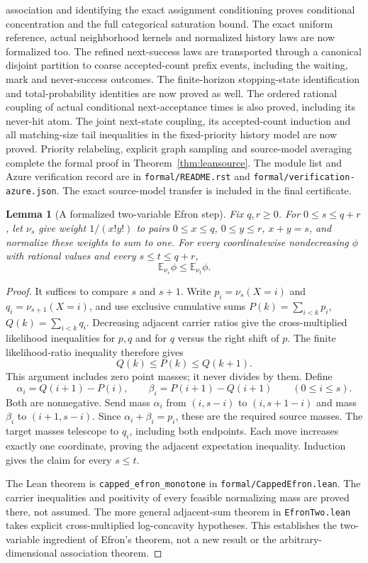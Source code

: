 \documentclass[11pt]{article}
\newtheorem{lemma}{Lemma}
\begin{document}
association and identifying the exact assignment conditioning proves
conditional concentration and the full categorical saturation bound.
The exact uniform reference, actual neighborhood kernels and normalized
history laws are now formalized too. The refined next-success laws are
transported through a canonical disjoint partition to coarse accepted-count
prefix events, including the waiting, mark and never-success outcomes.
The finite-horizon stopping-state identification and total-probability
identities are now proved as well. The ordered rational coupling of actual
conditional next-acceptance times is also proved, including its never-hit
atom. The joint next-state coupling, its accepted-count induction and all
matching-size tail inequalities in the fixed-priority history model are
now proved. Priority relabeling, explicit graph sampling and source-model
averaging complete the formal proof in Theorem~\ref{thm:leansource}.
The module list and Azure
verification record are in \texttt{formal/README.rst} and
\texttt{formal/verification-azure.json}. The exact source-model transfer is included in the final certificate.

\begin{lemma}[A formalized two-variable Efron step]\label{lem:leanefronpair}
Fix $q,r\geq0$. For $0\leq s\leq q+r$, let $\nu_s$ give weight
$1/(x!y!)$ to pairs $0\leq x\leq q$, $0\leq y\leq r$, $x+y=s$,
and normalize these weights to sum to one. For every coordinatewise
nondecreasing $\phi$ with rational values and every $s\leq t\leq q+r$,
\[
 \mathbb E_{\nu_s}\phi\leq\mathbb E_{\nu_t}\phi.
\]
\end{lemma}
\begin{proof}
It suffices to compare $s$ and $s+1$. Write $p_i=\nu_s(X=i)$ and
$q_i=\nu_{s+1}(X=i)$, and use exclusive cumulative sums
$P(k)=\sum_{i<k}p_i$, $Q(k)=\sum_{i<k}q_i$.
Decreasing adjacent carrier ratios give the cross-multiplied likelihood
inequalities for $p,q$ and for $q$ versus the right shift of $p$.
The finite likelihood-ratio inequality therefore gives
\[
 Q(k)\leq P(k)\leq Q(k+1).
\]
This argument includes zero point masses; it never divides by them.
Define
\[
 \alpha_i=Q(i+1)-P(i),\qquad
 \beta_i=P(i+1)-Q(i+1)\qquad(0\leq i\leq s).
\]
Both are nonnegative. Send mass $\alpha_i$ from $(i,s-i)$ to
$(i,s+1-i)$ and mass $\beta_i$ to $(i+1,s-i)$.
Since $\alpha_i+\beta_i=p_i$, these are the required source masses.
The target masses telescope to $q_i$, including both endpoints.
Each move increases exactly one coordinate, proving the adjacent
expectation inequality. Induction gives the claim for every $s\leq t$.

The Lean theorem is \texttt{capped\_efron\_monotone} in
\texttt{formal/CappedEfron.lean}. The carrier inequalities and positivity
of every feasible normalizing mass are proved there, not assumed.
The more general adjacent-sum theorem in \texttt{EfronTwo.lean} takes
explicit cross-multiplied log-concavity hypotheses. This establishes the
two-variable ingredient of Efron's theorem, not a new result or the
arbitrary-dimensional association theorem.
\end{proof}
\end{document}
